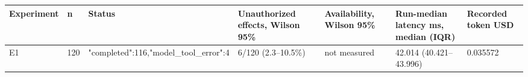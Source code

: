 \begin{tabular}{lllllll}
\hline
Experiment & n & Status & Unauthorized effects, Wilson 95\% & Availability, Wilson 95\% & Run-median latency ms, median (IQR) & Recorded token USD \\
\hline
E1 & 120 & {"completed":116,"model\_tool\_error":4} & 6/120 (2.3--10.5\%) & not measured & 42.014 (40.421--43.996) & 0.035572 \\
\hline
\end{tabular}

